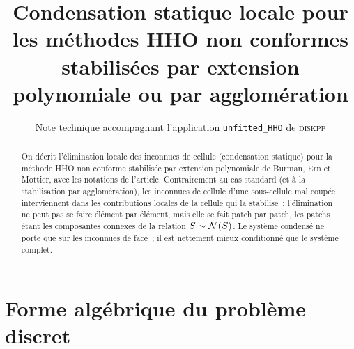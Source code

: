 \documentclass[11pt,a4paper]{article}
\title{Condensation statique locale pour les méthodes HHO non conformes\\
stabilisées par extension polynomiale ou par agglomération}
\author{Note technique accompagnant l'application \texttt{unfitted\_HHO} de \textsc{diskpp}}
\date{}
\theoremstyle{definition}
\theoremstyle{remark}
\begin{document}
\maketitle

\begin{abstract}
On décrit l'élimination locale des inconnues de cellule (condensation statique) pour la méthode
HHO non conforme stabilisée par extension polynomiale de Burman, Ern et Mottier, avec les notations
de l'article. Contrairement au cas standard (et à la stabilisation par agglomération), les inconnues
de cellule d'une sous-cellule mal coupée interviennent dans les contributions locales de la cellule
qui la stabilise~: l'élimination ne peut pas se faire élément par élément, mais elle se fait
patch par patch, les patchs étant les composantes connexes de la relation $S\sim\mathcal{N}(S)$.
Le système condensé ne porte que sur les inconnues de face~; il est nettement mieux conditionné
que le système complet.
\end{abstract}

\section{Forme algébrique du problème discret}
\end{document}
